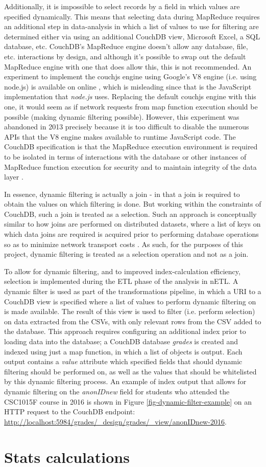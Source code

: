 Additionally, it is impossible to select records by a field in which values are specified dynamically. This means that selecting data during MapReduce requires an additional step in data-analysis in which a list of values to use for filtering are determined either via using an additional CouchDB view, Microsoft Excel, a SQL database, etc. CouchDB's MapReduce engine doesn't allow any database, file, etc. interactions by design, and although it's possible to swap out the default MapReduce engine with one that does allow this, this is not recommended. An experiment to implement the couchjs engine using Google's V8 engine (i.e. using node.js) is available on online \cite{v8couchjs}, which is misleading since that is the JavaScript implementation that \textit{node.js} uses. Replacing the default couchjs engine with this one, it would seem as if network requests from map function execution should be possible (making dynamic filtering possible). However, this experiment was abandoned in 2013 precisely because it is too difficult to disable the numerous APIs that the V8 engine makes available to runtime JavaScript code. The CouchDB specification is that the MapReduce execution environment is required to be isolated in terms of interactions with the database or other instances of MapReduce function execution for security and to maintain integrity of the data layer \cite{slack28Feb}.

In essence, dynamic filtering is actually a join - in that a join is required to obtain the values on which filtering is done. But working within the constraints of CouchDB, such a join is treated as a selection. Such an approach is conceptually similar to how joins are performed on distributed datasets, where a list of keys on which data joins are required is acquired prior to performing database operations so as to minimize network transport costs \cite{sonia2018}. As such, for the purposes of this project, dynamic filtering is treated as a selection operation and not as a join.

To allow for dynamic filtering, and to improved index-calculation efficiency, selection is implemented during the ETL phase of the analysis in nETL. A dynamic filter is used as part of the transformations pipeline, in which a URI to a CouchDB view is specified where a list of values to perform dynamic filtering on is made available. The result of this view is used to filter (i.e. perform selection) on data extracted from the CSVs, with only relevant rows from the CSV added to the database. This approach requires configuring an additional index prior to loading data into the database; a CouchDB database \textit{grades} is created and indexed using just a map function, in which a list of objects is output. Each output contains a \textit{value} attribute which specified fields that should dynamic filtering should be performed on, as well as the values that should be whitelisted by this dynamic filtering process. An example of index output that allows for dynamic filtering on the \textit{anonIDnew} field for students who attended the CSC1015F course in 2016 is shown in Figure \ref{fig-dynamic-filter-example} on an HTTP request to the CouchDB endpoint: \url{http://localhost:5984/grades/_design/grades/_view/anonIDnew-2016}.



\section{Stats calculations}
